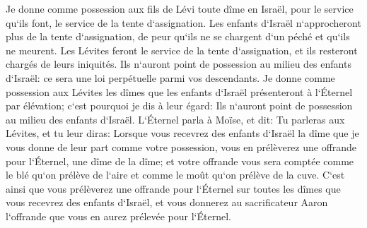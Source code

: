 \verse Je donne comme possession aux fils de Lévi toute dîme en Israël, pour le service qu`ils font, le service de la tente d`assignation. 
\verse Les enfants d`Israël n`approcheront plus de la tente d`assignation, de peur qu`ils ne se chargent d`un péché et qu`ils ne meurent. 
\verse Les Lévites feront le service de la tente d`assignation, et ils resteront chargés de leurs iniquités. Ils n`auront point de possession au milieu des enfants d`Israël: ce sera une loi perpétuelle parmi vos descendants. 
\verse Je donne comme possession aux Lévites les dîmes que les enfants d`Israël présenteront à l`Éternel par élévation; c`est pourquoi je dis à leur égard: Ils n`auront point de possession au milieu des enfants d`Israël. 
\verse L`Éternel parla à Moïse, et dit: 
\verse Tu parleras aux Lévites, et tu leur diras: Lorsque vous recevrez des enfants d`Israël la dîme que je vous donne de leur part comme votre possession, vous en prélèverez une offrande pour l`Éternel, une dîme de la dîme; 
\verse et votre offrande vous sera comptée comme le blé qu`on prélève de l`aire et comme le moût qu`on prélève de la cuve. 
\verse C`est ainsi que vous prélèverez une offrande pour l`Éternel sur toutes les dîmes que vous recevrez des enfants d`Israël, et vous donnerez au sacrificateur Aaron l`offrande que vous en aurez prélevée pour l`Éternel. 
